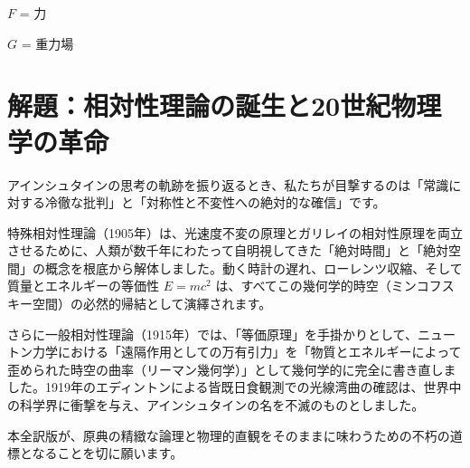 \documentclass[a4paper,11pt,openany]{ltjsbook}
\begin{document}
$F$ = 力

$G$ = 重力場


\clearpage

\backmatter

\chapter*{解題：相対性理論の誕生と20世紀物理学の革命}

アインシュタインの思考の軌跡を振り返るとき、私たちが目撃するのは「常識に対する冷徹な批判」と「対称性と不変性への絶対的な確信」です。

特殊相対性理論（1905年）は、光速度不変の原理とガリレイの相対性原理を両立させるために、人類が数千年にわたって自明視してきた「絶対時間」と「絶対空間」の概念を根底から解体しました。動く時計の遅れ、ローレンツ収縮、そして質量とエネルギーの等価性 $E = mc^2$ は、すべてこの幾何学的時空（ミンコフスキー空間）の必然的帰結として演繹されます。

さらに一般相対性理論（1915年）では、「等価原理」を手掛かりとして、ニュートン力学における「遠隔作用としての万有引力」を「物質とエネルギーによって歪められた時空の曲率（リーマン幾何学）」として幾何学的に完全に書き直しました。1919年のエディントンによる皆既日食観測での光線湾曲の確認は、世界中の科学界に衝撃を与え、アインシュタインの名を不滅のものとしました。

本全訳版が、原典の精緻な論理と物理的直観をそのままに味わうための不朽の道標となることを切に願います。
\end{document}
